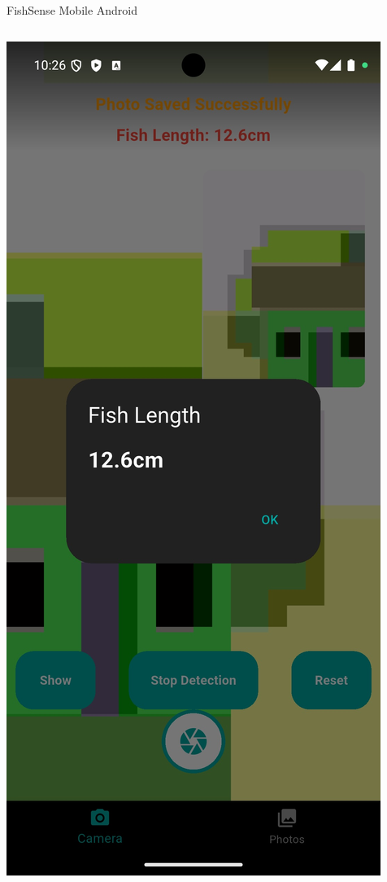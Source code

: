 \begin{frame}{FishSense Mobile Android}
    \vfill
    \centering
    \begin{columns}
        \begin{column}{0.32\textwidth}
            \centering
            \includegraphics[height=0.8\textheight,keepaspectratio]{images/CameraImage.jpg}
            

\end{column}
\end{columns}
\end{frame}
